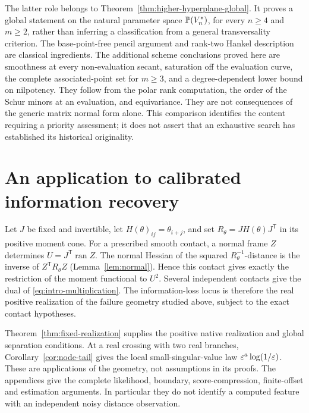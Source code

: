 The latter role belongs to
Theorem~\ref{thm:higher-hyperplane-global}. It proves a global statement
on the natural parameter space $\mathbb P(V_n^*)$, for every $n\ge4$ and
$m\ge2$, rather than inferring a classification from a general
transversality criterion. The base-point-free pencil argument and
rank-two Hankel description are classical ingredients. The additional
scheme conclusions proved here are smoothness at every non-evaluation
secant, saturation off the evaluation curve, the complete associated-point
set for $m\ge3$, and a degree-dependent lower bound on nilpotency.
They follow from the polar rank computation, the order of the Schur
minors at an evaluation, and equivariance. They are not consequences
of the generic matrix normal form alone. This comparison identifies
the content requiring a priority assessment; it does not assert that
an exhaustive search has established its historical originality.

\section{An application to calibrated information recovery}
\label{sec:application-bridge}
Let $J$ be fixed and invertible, let $H(\theta)_{ij}=\theta_{i+j}$,
and set $R_\theta=JH(\theta)J^{\mathsf T}$ in its positive moment
cone. For a prescribed smooth contact, a normal frame $Z$ determines
$U=J^{\mathsf T}\operatorname{ran}Z$. The normal Hessian of the
squared $R_\theta^{-1}$-distance is the inverse of
$Z^{\mathsf T}R_\theta Z$ (Lemma~\ref{lem:normal}). Hence this
contact gives exactly the restriction of the moment functional to
$U^2$. Several independent contacts give the dual of
\eqref{eq:intro-multiplication}. The information-loss locus is
therefore the real positive realization of the failure geometry
studied above, subject to the exact contact hypotheses.

Theorem~\ref{thm:fixed-realization} supplies the positive native
realization and global separation conditions. At a real crossing
with two real branches, Corollary~\ref{cor:node-tail} gives the local
small-singular-value law $\varepsilon^a\log(1/\varepsilon)$. These are applications
of the geometry, not assumptions in its proofs. The appendices give
the complete likelihood, boundary, score-compression, finite-offset
and estimation arguments. In particular they do not identify a
computed feature with an independent noisy distance observation.
